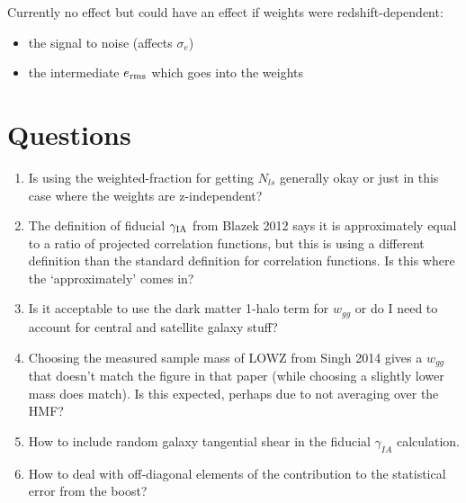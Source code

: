 \documentclass[onecolumn,amsmath,aps,fleqn, superscriptaddress]{revtex4}
\begin{document}
Currently no effect but could have an effect if weights were redshift-dependent:
\begin{itemize}
\item{the signal to noise (affects $\sigma_e$)}
\item{the intermediate $e_{\rm rms}$ which goes into the weights}
\end{itemize}

\section*{Questions}
\begin{enumerate}
\item{Is using the weighted-fraction for getting $N_{ls}$ generally okay or just in this case where the weights are z-independent? }
\item{The definition of fiducial $\gamma_{\rm IA}$ from Blazek 2012 says it is approximately equal to a ratio of projected correlation functions, but this is using a different definition than the standard definition for correlation functions. Is this where the `approximately' comes in?}
\item{Is it acceptable to use the dark matter 1-halo term for $w_{gg}$ or do I need to account for central and satellite galaxy stuff?}
\item{Choosing the measured sample mass of LOWZ from Singh 2014 gives a $w_{gg}$ that doesn't match the figure in that paper (while choosing a slightly lower mass does match). Is this expected, perhaps due to not averaging over the HMF?}
\item{How to include random galaxy tangential shear in the fiducial $\gamma_{IA}$ calculation.}
\item{How to deal with off-diagonal elements of the contribution to the statistical error from the boost?}
\end{enumerate}


\end{document}
